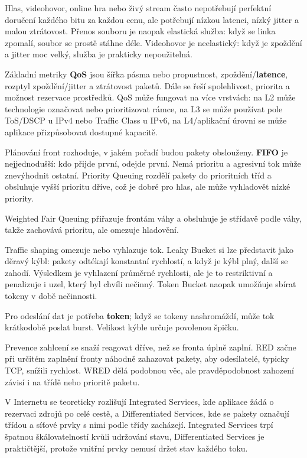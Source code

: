 \documentclass[11pt,a4paper]{article}
\begin{document}
Hlas, videohovor, online hra nebo živý stream často nepotřebují perfektní doručení každého bitu za každou cenu, ale potřebují nízkou latenci, nízký jitter a malou ztrátovost. Přenos souboru je naopak elastická služba: když se linka zpomalí, soubor se prostě stáhne déle. Videohovor je neelastický: když je zpoždění a jitter moc velký, služba je prakticky nepoužitelná.

Základní metriky \textbf{QoS} jsou šířka pásma nebo propustnost, zpoždění/\textbf{latence}, rozptyl zpoždění/jitter a ztrátovost paketů. Dále se řeší spolehlivost, priorita a možnost rezervace prostředků. QoS může fungovat na více vrstvách: na L2 může technologie označovat nebo prioritizovat rámce, na L3 se může používat pole ToS/DSCP u IPv4 nebo Traffic Class u IPv6, na L4/aplikační úrovni se může aplikace přizpůsobovat dostupné kapacitě.

Plánování front rozhoduje, v jakém pořadí budou pakety obslouženy. \textbf{FIFO} je nejjednodušší: kdo přijde první, odejde první. Nemá prioritu a agresivní tok může znevýhodnit ostatní. Priority Queuing rozdělí pakety do prioritních tříd a obsluhuje vyšší prioritu dříve, což je dobré pro hlas, ale může vyhladovět nízké priority.

Weighted Fair Queuing přiřazuje frontám váhy a obsluhuje je střídavě podle váhy, takže zachovává prioritu, ale omezuje hladovění.

Traffic shaping omezuje nebo vyhlazuje tok. Leaky Bucket si lze představit jako děravý kýbl: pakety odtékají konstantní rychlostí, a když je kýbl plný, další se zahodí. Výsledkem je vyhlazení průměrné rychlosti, ale je to restriktivní a penalizuje i uzel, který byl chvíli nečinný. Token Bucket naopak umožňuje sbírat tokeny v době nečinnosti.

Pro odeslání dat je potřeba \textbf{token}; když se tokeny nashromáždí, může tok krátkodobě poslat burst. Velikost kýble určuje povolenou špičku.

Prevence zahlcení se snaží reagovat dříve, než se fronta úplně zaplní. RED začne při určitém zaplnění fronty náhodně zahazovat pakety, aby odesílatelé, typicky TCP, snížili rychlost. WRED dělá podobnou věc, ale pravděpodobnost zahození závisí i na třídě nebo prioritě paketu.

V Internetu se teoreticky rozlišují Integrated Services, kde aplikace žádá o rezervaci zdrojů po celé cestě, a Differentiated Services, kde se pakety označují třídou a síťové prvky s nimi podle třídy zacházejí. Integrated Services trpí špatnou škálovatelností kvůli udržování stavu, Differentiated Services je praktičtější, protože vnitřní prvky nemusí držet stav každého toku.
\end{document}
